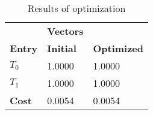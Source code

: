 \begin{table}[h!]
\centering
\begin{tabular}{lll}
\textbf{}      & \cellcolor[HTML]{EFEFEF}\textbf{Vectors} & \textbf{}          \\
\rowcolor[HTML]{EFEFEF} 
\textbf{Entry} & \textbf{Initial}                               & \textbf{Optimized} \\
$T_0$ & 1.0000 & 1.0000 \\ 
$T_1$ & 1.0000 & 1.0000 \\ 
\rowcolor[HTML]{EFEFEF} 
\textbf{Cost}  & 0.0054 & 0.0054 \\ 
\end{tabular}
\caption{Results of optimization}
\label{tab:OptimizationAnalysis}
\end{table}